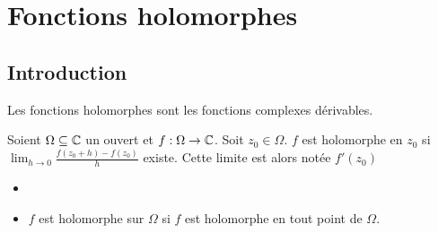\chapter{Fonctions holomorphes}
\section{Introduction}
Les fonctions holomorphes sont les fonctions complexes dérivables.
\begin{definition}
    
    Soient $\Omega\subseteq \mathbb{C}$ un ouvert et $f:\Omega\to\mathbb{C}$. Soit $z_0\in \Omega$. $f$ est holomorphe en $z_0$ si $\lim_{h\to 0}\frac{f(z_0 + h) - f(z_0)}{h}$ existe. Cette limite est alors notée $f'(z_0)$
    \begin{itemize}
        \item 
        \item $f$ est holomorphe sur $\Omega$ si $f$ est holomorphe en tout point de $\Omega$.
    \end{itemize}
\end{definition}

